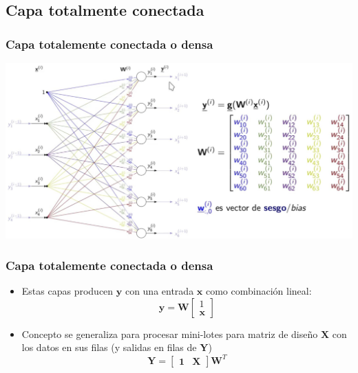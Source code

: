 \documentclass[svgnames,12pt,aspectratio=149]{beamer}
\begin{document}
\subsection{Capa totalmente conectada}
\begin{frame}
  \frametitle{Capa totalemente conectada o densa}
  \includegraphics[width= \textwidth]{im2}
  
\end{frame}
\begin{frame}
  \frametitle{Capa totalemente conectada o densa}
\begin{itemize}
\item Estas capas producen $\boldsymbol{y}$ con una entrada $\boldsymbol{x}$ como combinación lineal:
\begin{equation*}
\boldsymbol{y}=\boldsymbol{W} \begin{bmatrix} 1 \\ \boldsymbol{x} \end{bmatrix}
\end{equation*}
\item Concepto se generaliza para procesar mini-lotes para matriz de diseño $\boldsymbol{X}$ con los datos en sus filas (y salidas en filas de $\boldsymbol{Y} $) 
\begin{equation*}
\boldsymbol{Y}= \begin{bmatrix} \boldsymbol{1} & \boldsymbol{X} \end{bmatrix} \boldsymbol{W}^T
\end{equation*}
\end{itemize}
  
\end{frame}
\end{document}
